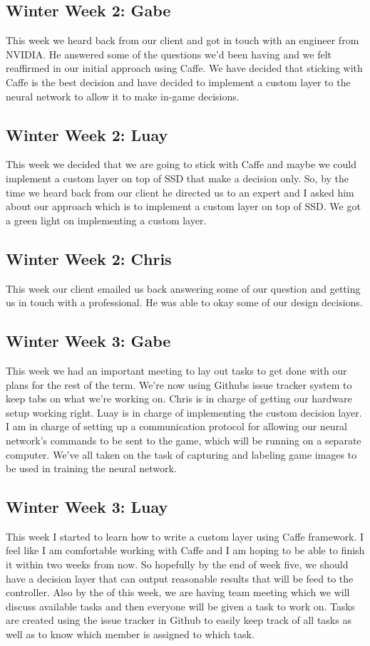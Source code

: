 \documentclass[onecolumn, draftclsnofoot,10pt, compsoc]{IEEEtran}
\begin{document}
\subsection{Winter Week 2: Gabe}
This week we heard back from our client and got in touch with an engineer from NVIDIA. He answered some of the questions we'd been having and we felt reaffirmed in our initial approach using Caffe. We have decided that sticking with Caffe is the best decision and have decided to implement a custom layer to the neural network to allow it to make in-game decisions.
\subsection{Winter Week 2: Luay}
This week we decided that we are going to stick with Caffe and maybe we could implement a custom layer on top of SSD that make a decision only. So, by the time we heard back from our client he directed us to an expert and I asked him about our approach which is to implement a custom layer on top of SSD. We got a green light on implementing a custom layer.
\subsection{Winter Week 2: Chris}
This week our client emailed us back answering some of our question and getting us in touch with a professional. He was able to okay some of our design decisions.
\subsection{Winter Week 3: Gabe}
This week we had an important meeting to lay out tasks to get done with our plans for the rest of the term. We're now using Githubs issue tracker system to keep tabs on what we're working on. Chris is in charge of getting our hardware setup working right. Luay is in charge of implementing the custom decision layer. I am in charge of setting up a communication protocol for allowing our neural network's commands to be sent to the game, which will be running on a separate computer. We've all taken on the task of capturing and labeling game images to be used in training the neural network.
\subsection{Winter Week 3: Luay}
This week I started to learn how to write a custom layer using Caffe framework. I feel like I am comfortable working with Caffe and I am hoping to be able to finish it within two weeks from now. So hopefully by the end of week five, we should have a decision layer that can output reasonable results that will be feed to the controller. Also by the of this week, we are having team meeting which we will discuss available tasks and then everyone will be given a task to work on. Tasks are created using the issue tracker in Github to easily keep track of all tasks as well as to know which member is assigned to which task.
\end{document}

